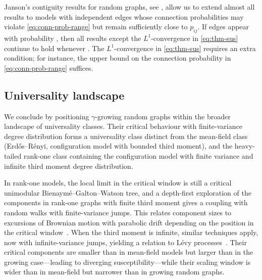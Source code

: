 \documentclass[a4paper, a4wide, 10pt, reqno]{amsart}
\theoremstyle{plain}
\theoremstyle{definition}
\numberwithin{equation}{section}
\begin{document}
Janson's contiguity results for random graphs, see \cite[Corollary 2.12(ii)]{J10}, allow us to extend almost all results to models with independent edges whose connection probabilities may violate \eqref{eq:conn-prob-range} but remain sufficiently close to $p_{ij}$. If edges appear with probability , then all results except the $L^1$-convergence in \eqref{eq:thm-sus} continue to hold whenever  .
The $L^1$-convergence in \eqref{eq:thm-sus} requires an extra condition; for instance, the upper bound  on the connection probability in \eqref{eq:conn-prob-range} suffices.


\subsection{Universality landscape}\label{sec:rank-one}
We conclude by positioning $\gamma$-growing random graphs within the broader landscape of universality classes. 
Their critical behaviour with finite-variance degree distribution forms a universality class distinct from the mean-field class (Erd\H{o}s--R\'enyi, configuration model with bounded third moment), and the heavy-tailed rank-one class containing the configuration model with finite variance and infinite third moment
degree distribution.

\smallskip
In rank-one models, the local limit in the critical window
is still a critical unimodular Bienaym\'e--Galton--Watson tree, and a depth-first exploration of the components in rank-one graphs with finite third moment gives a coupling with random walks with finite-variance jumps. This relates component sizes to excursions of Brownian motion with parabolic drift depending on the position in the critical window~\cite{Bha10, Dhara, Joseph2014}. When the third moment is infinite, similar techniques apply, now with infinite-variance jumps, yielding a relation to L\'evy processes~\cite{bhamidi2012novel, ConchonGoldschmidt2023stable, Dhara2}. Their critical components are smaller than in mean-field models but larger than in the growing case---leading to diverging susceptibility---while their scaling window is wider than in mean-field but narrower than in growing random graphs. 
\end{document}
